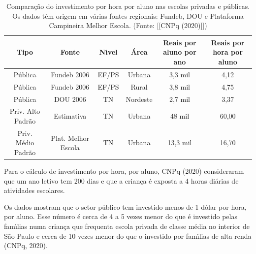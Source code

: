 \documentclass[
12pt,		%
openright,	%
twoside,  %
a4paper,			%
chapter=TITLE,		%
english,			%
french,				%
spanish,			%
brazil				%
]{USPSC-classe/USPSC}
\begin{document}
\begin{table}[htb]
\tiny
\caption{\label{489af209007e651b007535a7733d5ca117c5b310}Compara\c{c}\~ao do investimento por hora por aluno nas escolas privadas e p\'ublicas. Os dados t\^em origem em v\'arias fontes regionais: Fundeb, DOU e Plataforma Campineira Melhor Escola. (Fonte:  [[CNPq (2020)]])}

\centering
\begin{tabular}{|c|c|c|c|c|c|}
\hline
Tipo  &  Fonte  &  N\'{\i}vel  &  \'Area  &  Reais por aluno por ano  &  Reais por hora por aluno \\
\hline
P\'ublica  &  Fundeb 2006  &  EF/PS  &  Urbana  &  3,3 mil  &  4,12 \\
P\'ublica  &  Fundeb 2006  &  EF/PS  &  Rural  &  3,8 mil  &  4,75 \\
P\'ublica  &  DOU 2006  &  TN  &  Nordeste  &  2,7 mil  &  3,37 \\
Priv. Alto Padr\~ao  &  Estimativa  &  TN  &  Urbana  &  48 mil  &  60,00 \\
Priv. M\'edio Padr\~ao  &  Plat. Melhor Escola  &  TN  &  Urbana  &  13,3 mil  &  16,70 \\
\hline
\end{tabular}
\end{table}


Para o c\'alculo de investimento por hora, por aluno,  CNPq (2020) consideraram que um ano letivo tem 200 dias e que a crian\c{c}a \'e exposta a 4 horas di\'arias de atividades escolares.










Os dados mostram que o setor p\'ublico tem investido menos de 1 d\'olar por hora, por aluno. Esse n\'umero \'e cerca de 4 a 5 vezes menor do que \'e investido pelas fam\'{\i}lias numa crian\c{c}a que frequenta escola privada de classe m\'edia no interior de S\~ao Paulo e cerca de 10 vezes menor do que o investido por fam\'{\i}lias de alta renda  (CNPq, 2020).











\noindent\begin{center}\mbox{\centering{}}\end{center}
\end{document}
